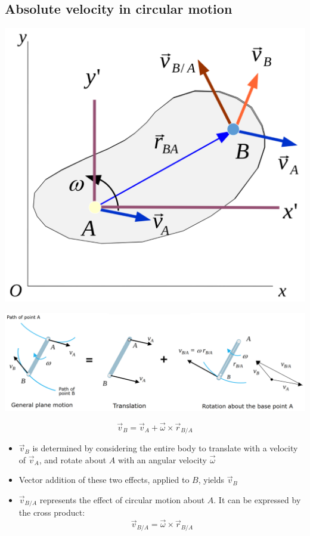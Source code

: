 \documentclass[11pt]{article}
\begin{document}
\subsection{Absolute velocity in circular motion}
\label{sec:orgda1879c}
\begin{center}
\includegraphics[scale=0.5]{./images/planar-motion-of-a-rigid-slab-velocity.png}
\end{center}

\begin{center}
\includegraphics[width=.9\linewidth]{./images/relative-motion-analysis-velocity.png}
\end{center}
\[\vec{v}_B = \vec{v}_A + \vec{\omega} \times \vec{r}_{B/A}\]

\begin{itemize}
\item \(\vec{v}_B\) is determined by considering the entire body to translate with a velocity of \(\vec{v}_A\), and rotate about \(A\) with an angular velocity \(\vec{\omega}\)
\item Vector addition of these two effects, applied to \(B\), yields \(\vec{v}_B\)
\item \(\vec{v}_{B/A}\) represents the effect of circular motion about \(A\). It can be expressed by the cross product:
\[\vec{v}_{B/A} = \vec{\omega} \times \vec{r}_{B/A}\]
\end{itemize}
\end{document}

